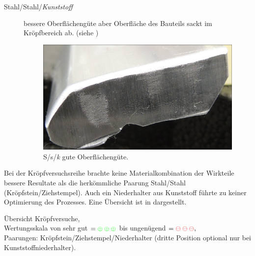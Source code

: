 \documentclass[12pt,a4paper,parskip,twoside,BCOR5mm,headsepline]{scrartcl}
\begin{document}
\begin{description*}
\begin{description}
\item[Stahl/Stahl/\emph{Kunststoff}] bessere Oberflächengüte aber Oberfläche des Bauteils sackt im Kröpfbereich ab. (siehe )
\begin{figure}[H]
\centering
\includegraphics[width=.8\textwidth]{Ssk1}
\caption{S/s/\emph{k} gute Oberflächengüte. }
\label{fig:Ssk1}
\end{figure}
\end{description}
Bei der Kröpfversuchsreihe brachte keine Materialkombination der Wirkteile bessere Resultate als die herkömmliche Paarung Stahl/Stahl (Kröpfstein/Ziehstempel). Auch ein Niederhalter aus Kunststoff führte zu keiner Optimierung des Prozesses.  Eine Übersicht ist in  dargestellt.

\begin{table}[hbtp]              
\caption{Übersicht Kröpfversuche,\\ Wertungsskala von sehr gut $= \textcolor{green}{\oplus\oplus\oplus}$ bis ungenügend $= \textcolor{red}{\ominus\ominus\ominus},$ \\Paarungen: Kröpfstein/Ziehstempel/Niederhalter (dritte Position optional nur bei Kunststoffniederhalter).}


\end{table}
\end{description*}
\end{document}
